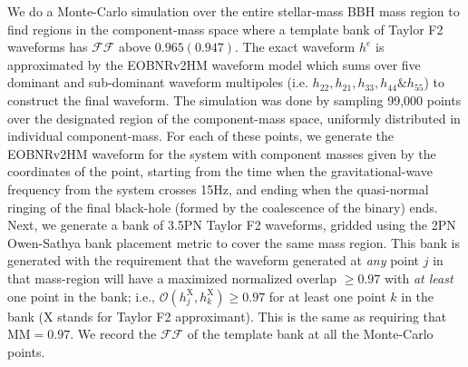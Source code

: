 \documentclass[aps,
prd,
amsmath,
amssymb,
twocolumn,
floatfix,
groupedaddress]{revtex4-1}
\newcommand{\Olap}{\mathcal{O}}
\newcommand{\FF}{\mathcal{FF}}
\newcommand{\MM}{\mathrm{MM}}
\newcommand{\X}{\mathrm{X}}
\begin{document}

We do a Monte-Carlo simulation over the entire stellar-mass BBH mass region to find regions in the component-mass space where a template bank of Taylor F2 waveforms has $\mathcal{FF}$ above $0.965 (0.947)$. The exact waveform $h^e$ is approximated by the EOBNRv2HM waveform model which sums over five dominant and sub-dominant waveform multipoles (i.e. $h_{22},h_{21},h_{33},h_{44}\&h_{55}$) to construct the final waveform.
The simulation was done by sampling 99,000 points over the designated region of the component-mass space, uniformly distributed in individual component-mass. For each of these points, we generate the EOBNRv2HM waveform for the system with component masses given by the coordinates of the point, starting from the time when the gravitational-wave frequency from the system crosses 15Hz, and ending when the quasi-normal ringing of the final black-hole (formed by the coalescence of the binary) ends. Next, we generate a bank of 3.5PN Taylor F2 waveforms, gridded using the 2PN Owen-Sathya bank placement metric \citep{OwenTemplateSpacing,SathyaBankPlacementTauN,SathyaMetric2PN} to cover the same mass region. This bank is generated with the requirement that the waveform generated at \textit{any} point $j$ in that mass-region will have a maximized normalized overlap $\geq 0.97$ with \textit{at least} one point in the bank; i.e., $\Olap(h^{\X}_j,h^{\X}_k)\geq 0.97$ for at least one point $k$ in the bank ($\X$ stands for Taylor F2 approximant). This is the same as requiring that $\MM=0.97$. We record the $\mathcal{FF}$ of the template bank at all the Monte-Carlo points.
\end{document}
